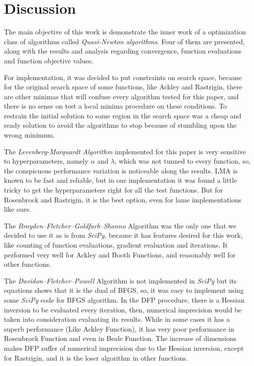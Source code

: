 

\section{Discussion}

The main objective of this work is demonstrate the inner work of a optimization class of algorithms called \textit{Quasi-Newton algorithms}. Four of them are presented, along with the results and analysis regarding convergence, function evaluations and function objective values.

For implementation, it was decided to put constraints on search space, because for the original search space of some functions, like Ackley and Rastrigin, there are other minimas that will confuse every algorithm tested for this paper, and there is no sense on test a local minima procedure on these conditions. To restrain the initial solution to some region in the search space was a cheap and ready solution to avoid the algorithms to stop because of stumbling upon the wrong minimum.


The \textit{Levenberg-Marquardt Algorithm} implemented for this paper is very sensitive to hyperparameters, namely $\alpha$ and $\lambda$, which was not tunned to every function, so, the conspicuous performance variation is noticeable along the results. LMA is known to be fast and reliable, but in our implementation it was found a little tricky to get the hyperparameters right for all the test functions. But for Rosenbrock and Rastrigin, it is the best option, even for lame implementations like ours.

The \textit{Broyden–Fletcher–Goldfarb–Shanno} Algorithm was the only one that we decided to use it as is from \textit{SciPy}, because it has features desired for this work, like counting of function evaluations, gradient evaluation and iterations. It performed very well for Ackley and Booth Functions, and reasonably well for other functions.

The \textit{Davidon–Fletcher–Powell} Algorithm is not implemented in \textit{SciPy} but its equations shows that it is the dual of BFGS, so, it was easy to implement using some \textit{SciPy} code for BFGS algorithm. In the DFP procedure, there is a Hessian inversion to be evaluated every iteration, then, numerical imprecision would be taken into consideration evaluating its results. While in some cases it has a superb performance (Like Ackley Function), it has very poor performance in Rosenbrock Function and even in Beale Function. The increase of dimensions makes DFP suffer of numerical imprecision due to the Hessian inversion, except for Rastrigin, and it is the loser algorithm in other functions.

